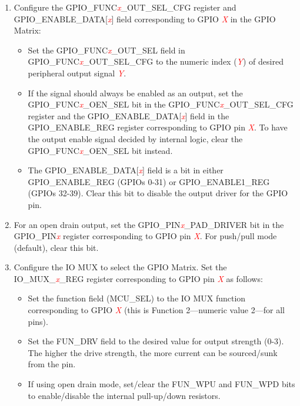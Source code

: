 \documentclass[main\_\_EN.tex]{subfiles}
\begin{document}
\begin{enumerate}
    \item Configure the GPIO\_FUNC\textcolor{red}{\it{x}}\_OUT\_SEL\_CFG register and GPIO\_ENABLE\_DATA[\textcolor{red}{\it{x}}] field corresponding to GPIO \textcolor{red}{\it{X}} in the GPIO Matrix:
    \begin{itemize}
        \item Set the GPIO\_FUNC\textcolor{red}{\it{x}}\_OUT\_SEL field in GPIO\_FUNC\textcolor{red}{\it{x}}\_OUT\_SEL\_CFG to the numeric index (\textcolor{red}{\it{Y}}) of desired peripheral output signal \textcolor{red}{\it{Y}}.
        \item If the signal should always be enabled as an output, set the GPIO\_FUNC\textcolor{red}{\it{x}}\_OEN\_SEL bit in the GPIO\_FUNC\textcolor{red}{\it{x}}\_OUT\_SEL\_CFG register and the GPIO\_ENABLE\_DATA[\textcolor{red}{\it{x}}] field in the GPIO\_ENABLE\_REG register corresponding to GPIO pin \textcolor{red}{\it{X}}. To have the output enable signal decided by internal logic, clear the GPIO\_FUNC\textcolor{red}{\it{x}}\_OEN\_SEL bit instead.
        \item The GPIO\_ENABLE\_DATA[\textcolor{red}{\it{x}}] field is a bit in either GPIO\_ENABLE\_REG (GPIOs 0-31) or GPIO\_ENABLE1\_REG (GPIOs 32-39). Clear this bit to disable the output driver for the GPIO pin.
    \end{itemize}
    \item For an open drain output, set the GPIO\_PIN\textcolor{red}{\it{x}}\_PAD\_DRIVER bit in the GPIO\_PIN\textcolor{red}{\it{x}} register corresponding to GPIO pin \textcolor{red}{\it{X}}. For push/pull mode (default), clear this bit.
    \item Configure the IO MUX to select the GPIO Matrix. Set the IO\_MUX\_\textcolor{red}{\it{x}}\_REG register corresponding to GPIO pin \textcolor{red}{\it{X}} as follows:
    \begin{itemize}
        \item Set the function field (MCU\_SEL) to the IO MUX function corresponding to GPIO \textcolor{red}{\it{X}} (this is Function 2---numeric value 2---for all pins).
        \item Set the FUN\_DRV field to the desired value for output strength (0-3). The higher the drive strength, the more current can be sourced/sunk from the pin.
\item If using open drain mode, set/clear the FUN\_WPU and FUN\_WPD bits to enable/disable the internal pull-up/down resistors.
    \end{itemize}
\end{enumerate}
\end{document}
